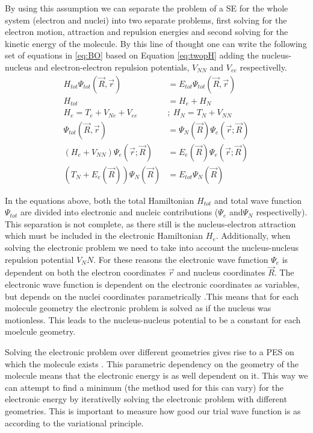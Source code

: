 \documentclass[../master_thesis.tex]{subfiles}
\begin{document}
By using this assumption we can separate the problem of a \ac{SE} for the whole
system (electron and nuclei) into two separate problems, first solving for the
electron motion, attraction and repulsion energies and second solving for the
kinetic energy of the molecule\cite{Cramer:2004}. By this line of thought one
can write the following set of equations in \ref{eq:BO} based on Equation
\ref{eq:twopH} adding the nucleus-nucleus
and electron-electron repulsion potentials, $ V_{NN} $ and $ V_{ee} $
respectivelly.
\begin{equation}
  \begin{split}\label{eq:BO}
    H_{tot}\Psi_{tot}(\vec{R}, \vec{r}) &= E_{tot}\Psi_{tot}(\vec{R},
    \vec{r})\\
    H_{tot} &= H_e + H_N \\
    H_e = T_e + V_{Ne} + V_{ee} ~&;~ H_N = T_N + V_{NN} \\
    \Psi_{tot}(\vec{R}, \vec{r}) &= \Psi_N(\vec{R})\Psi_e(\vec{r}; \vec{R}) \\
    (H_e + V_{NN})\Psi_e(\vec{r}; \vec{R}) &= E_e(\vec{R})\Psi_e(\vec{r};
    \vec{R})\\
    (T_N + E_e(\vec{R}))\Psi_N(\vec{R}) &= E_{tot}\Psi_N(\vec{R})
  \end{split}
\end{equation}

In the equations above, both the total Hamiltonian $H_{tot}$ and total
wave function $\Psi_{tot}$ are divided into electronic and nucleic contributions
($\Psi_e$ and$\Psi_N$ respectivelly). This separation is not complete, as there
still is the nucleus-electron attraction which must be included in the
electronic Hamiltonian $H_e$. Additionally, when solving the electronic problem
we need to take into account the nucleus-nucleus repulsion potential $V_NN$.
For these reasons the electronic wave function $\Psi_e$ is dependent on both the
electron coordinates $\vec{r}$ and nucleus coordinates $\vec{R}$. The
electronic wave function is dependent on the electronic coordinates as
variables, but depends on the nuclei coordinates parametrically
\cite{Jensen:2017}.This means that for each molecule geometry the electronic
problem is solved as if the nucleus was motionless. This leads to the
nucleus-nucleus potential to be a constant for each moelcule geometry.

Solving the electronic problem over different geometries gives rise to a
\ac{PES} on which the molecule exists \cite{Cramer:2004}. This parametric
dependency on the geometry of the molecule means that the electronic energy is
as well dependent on it. This way we can attempt to find a minimum (the method
used for this can vary) for the electronic energy by iterativelly solving the
electronic problem with different geometries. This is important to measure how
good our trial wave function is as according to the variational principle.
\end{document}
